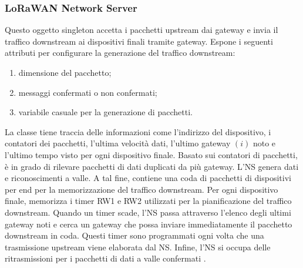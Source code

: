 \documentclass[a4paper]{report} %
\begin{document}
\subsubsection{LoRaWAN Network Server}
Questo oggetto singleton accetta i pacchetti upstream dai gateway e invia il traffico downstream ai dispositivi finali tramite gateway. Espone i seguenti attributi per configurare la generazione del traffico downstream:
\begin{enumerate}
\item dimensione del pacchetto;
\item messaggi confermati o non confermati;
\item variabile casuale per la generazione di pacchetti.
\end{enumerate}
La classe tiene traccia delle informazioni come l'indirizzo del dispositivo, i contatori dei pacchetti, l'ultima velocità dati, l'ultimo gateway $(i)$ noto e l'ultimo tempo visto per ogni dispositivo finale. Basato sui contatori di pacchetti, è in grado di rilevare pacchetti di dati duplicati da più gateway. L'NS genera dati e riconoscimenti a valle. A tal fine, contiene una coda di pacchetti di dispositivi per end per la memorizzazione del traffico downstream. Per ogni dispositivo finale, memorizza i timer RW1 e RW2 utilizzati per la pianificazione del traffico downstream. Quando un timer scade, l'NS passa attraverso l'elenco degli ultimi gateway noti e cerca un gateway che possa inviare immediatamente il pacchetto downstream in coda. Questi timer sono programmati ogni volta che una trasmissione upstream viene elaborata dal NS. Infine, l'NS si occupa delle ritrasmissioni per i pacchetti di dati a valle confermati \cite{art:rif.49}.
\end{document}
